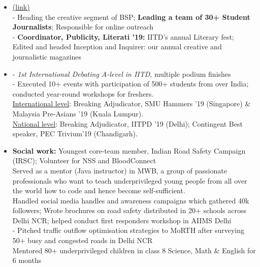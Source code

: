 \documentclass{article}
\begin{document}
\begin{itemize}
    \setlength\itemsep{0em}
    
    \item \underline{} \href{http://bsp.iitd.ac.in/}{(link)}\\
    - Heading the creative segment of BSP; \textbf{Leading a team of 30+ Student Journalists}; Responsible for online outreach \\
    - \textbf{Coordinator, Publicity, Literati '19:} IITD's annual Literary fest; Edited and headed Inception and Inquirer: our annual creative and journalistic magazines
    
    \item \underline{} - \textit{1st International Debating A-level in IITD}, multiple podium finishes \\
    - Executed 10+ events with participation of 500+ students from over India; conducted year-round workshops for freshers.\\
    \underline{International level}: Breaking Adjudicator, SMU Hammers '19 (Singapore) \& Malaysia Pre-Asians '19 (Kuala Lumpur).\\
    \underline{National level}: Breaking Adjudicator, IITPD '19 (Delhi); Contingent Best speaker, PEC Trivium'19 (Chandigarh).
    
    \item \textbf{Social work:} Youngest core-team member, Indian Road Safety Campaign (IRSC); Volunteer for NSS and BloodConnect\\

    \underline{} Served as a mentor (Java instructor) in MWB, a group of passionate professionals who want to teach underprivileged young people from all over the world how to code and hence become self-sufficient.\\

    \underline{} Handled social media handles and awareness campaigns which gathered 40k followers; Wrote brochures on road safety distributed in 20+ schools across Delhi NCR; helped conduct first responders workshop in AIIMS Delhi \\
    - Pitched traffic outflow optimisation strategies to MoRTH after surveying 50+ busy and congested roads in Delhi NCR\\
    \underline{} Mentored 80+ underprivileged children in class 8 Science, Math \& English for 6 months


\end{itemize}
\end{document}
